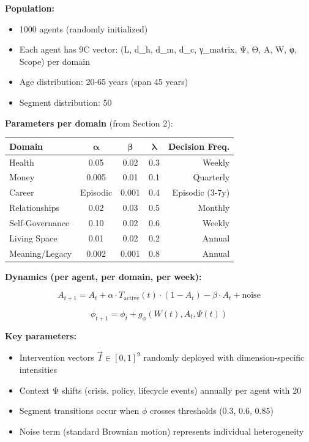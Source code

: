 \textbf{Population:}
\begin{itemize}[nosep]
\item 1000 agents (randomly initialized)
\item Each agent has 9C vector: (L, d_h, d_m, d_c, γ_matrix, Ψ, Θ, A, W, φ, Scope) per domain
\item Age distribution: 20-65 years (span 45 years)
\item Segment distribution: 50%
\end{itemize}

\textbf{Parameters per domain} (from Section 2):

\begin{center}
\small
\begin{tabular}{@{}lcccr@{}}
\toprule
\textbf{Domain} & $\boldsymbol{\alpha}$ & $\boldsymbol{\beta}$ & $\boldsymbol{\lambda}$ & \textbf{Decision Freq.} \\
\midrule
Health & 0.05 & 0.02 & 0.3 & Weekly \\
Money & 0.005 & 0.01 & 0.1 & Quarterly \\
Career & Episodic & 0.001 & 0.4 & Episodic (3-7y) \\
Relationships & 0.02 & 0.03 & 0.5 & Monthly \\
Self-Governance & 0.10 & 0.02 & 0.6 & Weekly \\
Living Space & 0.01 & 0.02 & 0.2 & Annual \\
Meaning/Legacy & 0.002 & 0.001 & 0.8 & Annual \\
\midrule
\end{tabular}
\end{center}

\textbf{Dynamics (per agent, per domain, per week):}

\begin{equation}
A_{t+1} = A_t + \alpha \cdot T_{\text{active}}(t) \cdot (1 - A_t) - \beta \cdot A_t + \text{noise}
\end{equation}

\begin{equation}
\phi_{t+1} = \phi_t + g_\phi(W(t), A_t, \Psi(t))
\end{equation}

\textbf{Key parameters:}
\begin{itemize}[nosep]
\item Intervention vectors $\vec{I} \in [0,1]^9$ randomly deployed with dimension-specific intensities
\item Context Ψ shifts (crisis, policy, lifecycle events) annually per agent with 20%
\item Segment transitions occur when $\phi$ crosses thresholds (0.3, 0.6, 0.85)
\item Noise term (standard Brownian motion) represents individual heterogeneity
\end{itemize}

